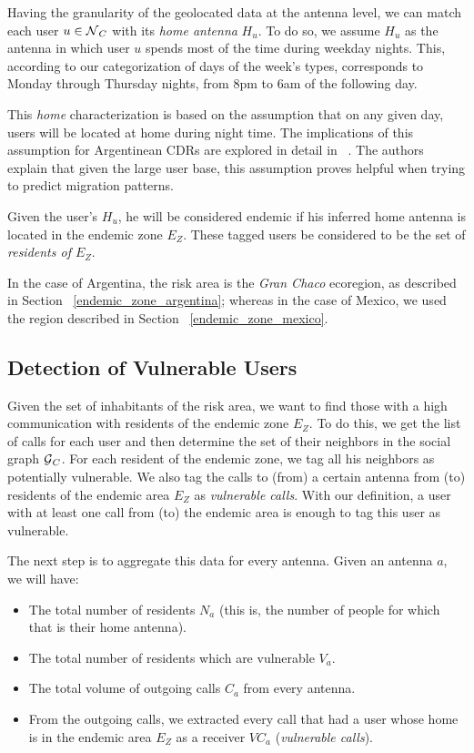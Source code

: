 Having the granularity of the geolocated data at the antenna level, we can match each user $u \in \operatorname{\mathcal{N}}_C$ with its \textit{home antenna} $H_u$. To do so, we assume $H_u$ as the antenna in which user $u$ spends most of the time during weekday nights. This, according to our categorization of days of the week's types, corresponds to Monday through Thursday nights, from 8pm to 6am of the following day. 

This \textit{home} characterization is based on the assumption that on any given day, users will be located at home during night time. The implications of this assumption for Argentinean CDRs are explored in detail in ~\cite{sarraute2015socialevents,csaji2012exploring}. The authors explain that given the large user base, this assumption proves helpful when trying to predict migration patterns.

Given the user's $H_u$, he will be considered endemic if his inferred home antenna is located in the endemic zone $E_Z$. These tagged users be considered to be the set of \textit{residents of $E_Z$}.

In the case of Argentina, the risk area is the \textit{Gran Chaco} ecoregion, as described in Section~ \cref{endemic_zone_argentina};
whereas in the case of Mexico, we used the region described in Section~ \cref{endemic_zone_mexico}.


\subsection{Detection of Vulnerable Users}

Given the set of inhabitants of the risk area, we want to find those with a high communication with residents of the endemic zone $E_Z$. To do this, we get the list of calls for each user and then determine the set of their neighbors in the social graph $\operatorname{\mathcal{G}}_C$. For each resident of the endemic zone, we tag all his neighbors as potentially vulnerable. We also tag the calls to (from) a certain antenna from (to) residents of the endemic area $E_Z$ as \textit{vulnerable calls}. With our definition, a user with at least one call from (to) the endemic area is enough to tag this user as vulnerable. 

The next step is to aggregate this data for every antenna. Given an antenna $a$, we will have:
\begin{itemize}
	\item The total number of residents $N_a$ (this is, the number of people for which that is their home antenna).
	\item The total number of residents which are vulnerable $V_a$.
	\item The total volume of outgoing calls $C_a$ from every antenna.
	\item From the outgoing calls, we extracted every call that had a user whose home is in the endemic area $E_Z$ as a receiver $VC_a$ (\textit{vulnerable calls}).
\end{itemize}

